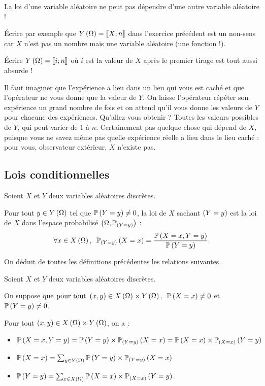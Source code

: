 \begin{rem}
La loi d'une variable aléatoire ne peut pas dépendre d'une autre variable aléatoire !

Écrire par exemple que \(Y\paren{\Omega}=\interventierii{X}{n}\) dans l'exercice précédent est un non-sens car \(X\) n'est pas un nombre mais une variable aléatoire (\ie une fonction !).

Écrire \(Y\paren{\Omega}=\interventierii{i}{n}\) où \(i\) est la valeur de \(X\) après le premier tirage est tout aussi absurde !

Il faut imaginer que l'expérience a lieu dans un lieu qui vous est caché et que l'opérateur ne vous donne que la valeur de \(Y\). On laisse l'opérateur répéter son expérience un grand nombre de fois et on attend qu'il vous donne les valeurs de \(Y\) pour chacune des expériences. Qu'allez-vous obtenir ? Toutes les valeurs possibles de \(Y\), qui peut varier de \(1\) à \(n\). Certainement pas quelque chose qui dépend de \(X\), puisque vous ne savez même pas quelle expérience réelle a lieu dans le lieu caché : pour vous, observateur extérieur, \(X\) n'existe pas.
\end{rem}

\subsection{Lois conditionnelles}

\begin{defi}
Soient \(X\) et \(Y\) deux variables aléatoires discrètes.

Pour tout \(y\in Y\paren{\Omega}\) tel que \(\proba{Y=y}\not=0\), la loi de \(X\) sachant \(\paren{Y=y}\) est la loi de \(X\) dans l'espace probabilisé \(\groupe{\Omega}[\prem_{\paren{Y=y}}]\) : \[\quantifs{\forall x\in X\paren{\Omega}}\probacond{X=x}{\paren{Y=y}}=\dfrac{\proba{X=x,Y=y}}{\proba{Y=y}}.\]
\end{defi}

On déduit de toutes les définitions précédentes les relations suivantes.

\begin{prop}
Soient \(X\) et \(Y\) deux variables aléatoires discrètes.

On suppose que \(\quantifs{\tpt\paren{x,y}\in X\paren{\Omega}\times Y\paren{\Omega}}\proba{X=x}\not=0\) et \(\proba{Y=y}\not=0\).

Pour tout \(\paren{x,y}\in X\paren{\Omega}\times Y\paren{\Omega}\), on a :

\begin{itemize}
    \item \(\proba{X=x,Y=y}=\proba{Y=y}\times\probacond{X=x}{\paren{Y=y}}=\proba{X=x}\times\probacond{Y=y}{\paren{X=x}}\) \\
    \item \(\proba{X=x}=\sum_{y\in Y\paren{\Omega}}\proba{Y=y}\times\probacond{X=x}{\paren{Y=y}}\) \\
    \item \(\proba{Y=y}=\sum_{x\in X\paren{\Omega}}\proba{X=x}\times\probacond{Y=y}{\paren{X=x}}\).
\end{itemize}
\end{prop}

